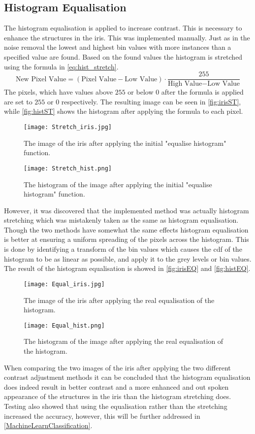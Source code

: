 \subsection{Histogram Equalisation}
The histogram equalisation is applied to increase contrast. This is necessary to enhance the structures in the iris. This was implemented manually. Just as in the noise removal the lowest and highest bin values with more instances than a specified value are found. Based on the found values the histogram is stretched using the formula in \autoref{eq:hist_stretch}.
\begin{equation}\label{eq:hist_stretch}
	\text{New~Pixel~Value}=(\text{Pixel~Value}-\text{Low~Value})\cdot\frac{255}{\text{High~Value}-\text{Low~Value}}
\end{equation}
The pixels, which have values above $ 255 $ or below $ 0 $ after the formula is applied are set to $ 255 $ or $ 0 $ respectively. The resulting image can be seen in \autoref{fig:irisST}, while \autoref{fig:histST} shows the histogram after applying the formula to each pixel.
\begin{figure}[h]
\centering
\texttt{[image: Stretch\_iris.jpg]}
\caption{The image of the iris after applying the initial "equalise histogram" function.}
\label{fig:irisST}
\end{figure}
\begin{figure}[h]
\centering
\texttt{[image: Stretch\_hist.png]}
\caption{The histogram of the image after applying the initial "equalise histogram" function.}
\label{fig:histST}
\end{figure}
However, it was discovered that the implemented method was actually histogram stretching which was mistakenly taken as the same as histogram equalisation. Though the two methods have somewhat the same effects histogram equalisation is better at ensuring a uniform spreading of the pixels across the histogram. 
This is done by identifying a transform of the bin values which causes the \gls{cdf} of the histogram to be as linear as possible, and apply it to the grey levels or bin values. The result of the histogram equalisation is showed in \autoref{fig:irisEQ} and \autoref{fig:histEQ}.
\begin{figure}[h]
\centering
\texttt{[image: Equal\_iris.jpg]}
\caption{The image of the iris after applying the real equalisation of the histogram.}
\label{fig:irisEQ}
\end{figure}
\begin{figure}[h]
\centering
\texttt{[image: Equal\_hist.png]}
\caption{The histogram of the image after applying the real equalisation of the histogram.}
\label{fig:histEQ}
\end{figure}
When comparing the two images of the iris after applying the two different contrast adjustment methods it can be concluded that the histogram equalisation does indeed result in better contrast and a more enhanced and out spoken appearance of the structures in the iris than the histogram stretching does. Testing also showed that using the equalisation rather than the stretching increased the accuracy, however, this will be further addressed in \autoref{MachineLearnClassification}. 

